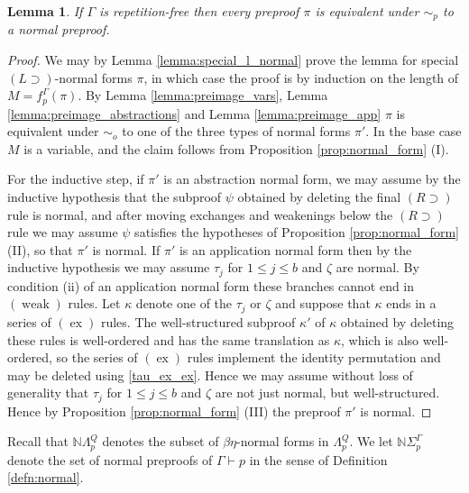 \documentclass[english,letter paper,12pt,leqno]{article}
\newtheorem{lemma}[theorem]{Lemma}
\theoremstyle{example}
\numberwithin{equation}{section}
\def\imp{\supset}
\begin{document}
\begin{lemma}\label{lemma:all_normal_eq} If $\Gamma$ is repetition-free then every preproof $\pi$ is equivalent under $\sim_p$ to a normal preproof.
\end{lemma}
\begin{proof}
We may by Lemma \ref{lemma:special_l_normal} prove the lemma for special $(L \imp)$-normal forms $\pi$, in which case the proof is by induction on the length of $M = f^\Gamma_p(\pi)$.
By Lemma \ref{lemma:preimage_vars}, Lemma \ref{lemma:preimage_abstractions} and Lemma \ref{lemma:preimage_app} $\pi$ is equivalent under $\sim_o$ to one of the three types of normal forms $\pi'$. In the base case $M$ is a variable, and the claim follows from Proposition \ref{prop:normal_form} (I). 

For the inductive step, if $\pi'$ is an abstraction normal form, we may assume by the inductive hypothesis that the subproof $\psi$ obtained by deleting the final $(R \imp)$ rule is normal, and after moving exchanges and weakenings below the $(R \imp)$ rule we may assume $\psi$ satisfies the hypotheses of Proposition \ref{prop:normal_form} (II), so that $\pi'$ is normal. If $\pi'$ is an application normal form then by the inductive hypothesis we may assume $\tau_j$ for $1 \le j \le b$ and $\zeta$ are normal. By condition (ii) of an application normal form these branches cannot end in $(\operatorname{weak})$ rules. Let $\kappa$ denote one of the $\tau_j$ or $\zeta$ and suppose that $\kappa$ ends in a series of $(\operatorname{ex})$ rules. The well-structured subproof $\kappa'$ of $\kappa$ obtained by deleting these rules is well-ordered and has the same translation as $\kappa$, which is also well-ordered, so the series of $(\operatorname{ex})$ rules implement the identity permutation and may be deleted using \eqref{tau_ex_ex}. Hence we may assume without loss of generality that $\tau_j$ for $1 \le j \le b$ and $\zeta$ are not just normal, but well-structured. Hence by Proposition \ref{prop:normal_form} (III) the preproof $\pi'$ is normal.
\end{proof}

Recall that $\mathbb{N} \Lambda^Q_p$ denotes the subset of $\beta\eta$-normal forms in $\Lambda^Q_p$. We let $\mathbb{N}\Sigma^\Gamma_p$ denote the set of normal preproofs of $\Gamma \vdash p$ in the sense of Definition \ref{defn:normal}.
\end{document}
